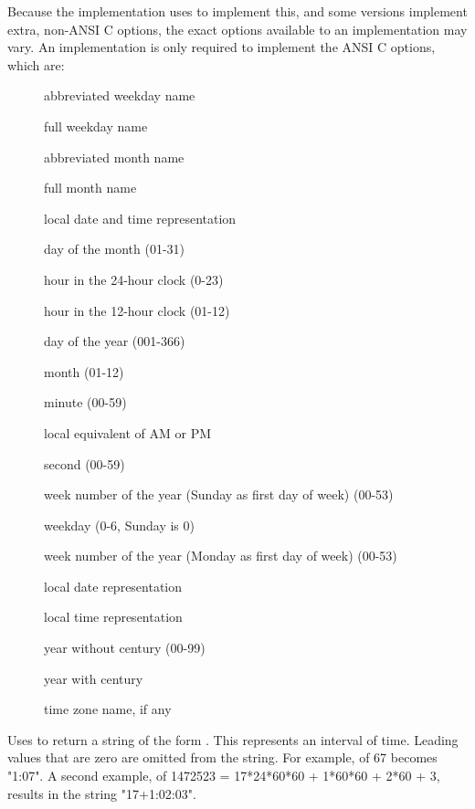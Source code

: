 \begin{description}
    Because the implementation uses  to implement this,
    and some
    versions implement extra, non-ANSI C options, the exact options
    available to an implementation may vary. An implementation is only
    required to implement the ANSI C options, which are: 
    \begin{description}
    \item[] abbreviated weekday name
    \item[] full weekday name
    \item[] abbreviated month name
    \item[] full month name
    \item[] local date and time representation
    \item[] day of the month (01-31)
    \item[] hour in the 24-hour clock (0-23)
    \item[] hour in the 12-hour clock (01-12)
    \item[] day of the year (001-366)
    \item[] month (01-12)
    \item[] minute (00-59)
    \item[] local equivalent of AM or PM
    \item[] second (00-59)
    \item[] week number of the year (Sunday as first day of week) (00-53)
    \item[] weekday (0-6, Sunday is 0)
    \item[] week number of the year (Monday as first day of week) (00-53)
    \item[] local date representation
    \item[] local time representation
    \item[] year without century (00-99)
    \item[] year with century
    \item[] time zone name, if any
    \end{description}

  \item[\Code{String interval(Integer seconds)}]
    Uses  to return a string of the form
    .
    This represents an interval of time.
    Leading values that are zero are omitted from the string.
    For example,  of 67 becomes "1:07".
    A second example,  of 
    1472523 = 17*24*60*60 + 1*60*60 + 2*60 + 3, results in the
    string "17+1:02:03".


\end{description}
